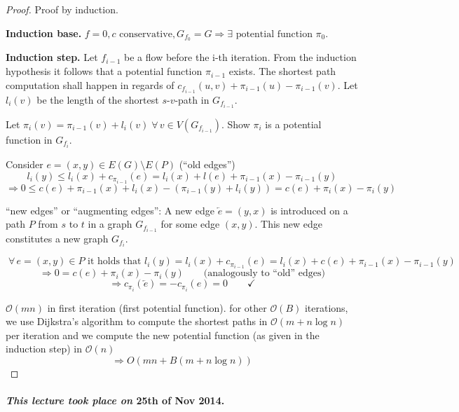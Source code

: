 \documentclass{article}
\newcommand{\dateref}[1]{\paragraph{\textit{This lecture took place on} #1.}}
\newcommand{\gath}[2]{$#1$-$#2$-path} %
\newcommand{\fall}{\;\forall\,}
\begin{document}
\begin{proof}
  Proof by induction.

  \textbf{Induction base.} $f=0, c \text{ conservative}, G_{f_0} = G \Rightarrow \exists \text{ potential function $\pi_0$}$.

  \textbf{Induction step.}
  Let $f_{i-1}$ be a flow before the i-th iteration. From the induction hypothesis it follows that a potential function $\pi_{i-1}$ exists. The shortest path computation shall happen in regards of
  $c_{f_{i-1}}(u,v) + \pi_{i-1}(u) - \pi_{i-1}(v)$. Let $l_i(v)$ be the length of the shortest \gath sv in $G_{f_{i-1}}$.

  Let $\pi_i(v) = \pi_{i-1}(v) + l_i(v) \fall v \in V(G_{f_{i-1}})$. Show $\pi_i$ is a potential function in $G_{f_i}$.

  Consider $e = (x, y) \in E(G) \setminus E(P)$ (``old edges'')
  \[
    l_i(y) \leq l_i(x) + c_{\pi_{i-1}}(e) = l_i(x) + l(e) + \pi_{i-1}(x) - \pi_{i-1}(y)
  \] \[
    \Rightarrow 0 \leq c(e) + \pi_{i-1}(x) + l_i(x) - \left(\pi_{i-1}(y) + l_i(y)\right)
      = c(e) + \pi_i(x) - \pi_i(y)
  \]

  ``new edges'' or ``augmenting edges'': A new edge $\overleftarrow{e} = (y, x)$ is introduced on a path $P$ from $s$ to $t$ in a graph $G_{f_{i-1}}$ for some edge $(x, y)$. This new edge constitutes a new graph $G_{f_i}$.

  \[
    \fall e = (x, y) \in P \text{ it holds that }
      l_i(y) = l_i(x) + c_{\pi_{i-1}}(e) = l_i(x) + c(e) + \pi_{i-1}(x) - \pi_{i-1}(y)
  \] \[
    \Rightarrow 0 = c(e) + \pi_i(x) - \pi_i(y) \qquad \text{(analogously to ``old'' edges)}
  \] \[
    \Rightarrow c_{\pi_i}(\overleftarrow{e}) = -c_{\pi_i}(e) = 0
      \qquad \checkmark
  \]

  $\mathcal{O}(mn)$ in first iteration (first potential function).
  for other $\mathcal{O}(B)$ iterations, we use Dijkstra's algorithm to compute the shortest paths in $\mathcal{O}(m + n \log{n})$ per iteration and we compute the new potential function (as given in the induction step) in $\mathcal{O}(n)$
  \[ \Rightarrow{O}(mn + B(m + n \log{n})) \]
\end{proof}

\dateref{25th of Nov 2014}
\end{document}
